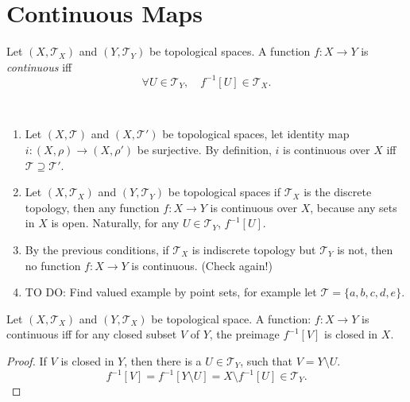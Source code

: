 \section{Continuous Maps}


\begin{definition}
	Let $(X, \mathcal T_X)$ and $(Y, \mathcal T_Y)$ be topological spaces. A function $f: X \to Y$ is \textit{continuous} iff
	$$
	\forall U \in \mathcal T_Y, \quad f^{-1}[U] \in \mathcal T_X.
	$$
\end{definition}


\begin{note} \
	\begin{enumerate}
		\item Let $(X, \mathcal T)$ and $(X, \mathcal T')$ be topological spaces, let identity map $i:(X, \rho) \to (X, \rho')$ be surjective. By definition, $i$ is continuous over $X$ iff $\mathcal T \supseteq \mathcal T'$.
		\item Let $(X, \mathcal T_X)$ and $(Y, \mathcal T_Y)$ be topological spaces if $\mathcal T_X$ is the discrete topology, then any function $f: X \to Y$ is continuous over $X$, because any sets in $X$ is open. Naturally, for any $U \in \mathcal T_Y$, $f^{-1}[U]$.
		\item By the previous conditions, if $\mathcal T_X$ is indiscrete topology but $\mathcal T_Y$ is not, then no function $f: X \to Y$ is continuous. (Check again!)
		\item TO DO: Find valued example by point sets, for example let $\mathcal T = \{a, b, c, d, e\}$.
	\end{enumerate}
\end{note}


\begin{lemma}
	Let $(X, \mathcal T_X)$ and $(Y, \mathcal T_X)$ be topological space. A function: $f:X\to Y$ is continuous iff for any closed subset $V$ of $Y$, the preimage $f^{-1}[V]$ is closed in $X$.
\end{lemma}


\begin{proof}
	If $V$ is closed in $Y$, then there is a $U \in \mathcal T_Y$, such that $V = Y \setminus U$.
	$$
	f^{-1}[V] = f^{-1}[Y \setminus U] = X \setminus f^{-1}[U] \in \mathcal T_Y.
	$$
\end{proof}


